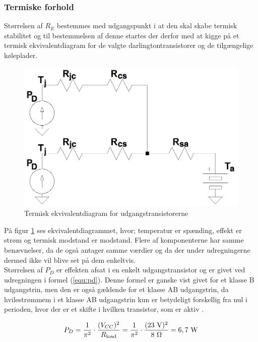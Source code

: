 \subsubsection*{Termiske forhold}
Størrelsen af $R_E$ bestemmes med udgangspunkt i at den skal skabe termisk stabilitet og til bestemmelsen af denne startes der derfor med at kigge på et termisk ekvivalentdiagram for de valgte darlingtontransistorer og de tilgængelige køleplader. 

\begin{figure}[h]
\centering
\includegraphics[scale=0.2]{teknisk/effektforstaerker/termisk_ekvivalentdiagram.png}
\caption{Termisk ekvivalentdiagram for udgangstransistorerne}
\label{fig:term-dia}
\end{figure}

På figur \ref{fig:term-dia} ses ekvivalentdiagrammet, hvor; temperatur er spænding, effekt er strøm og termisk modstand er modstand. Flere af komponenterne har samme benævnelser, da de også antager samme værdier og da der under udregningerne dermed ikke vil blive set på dem enkeltvis.\\
Størrelsen af $P_D$ er effekten afsat i en enkelt udgangstransistor og er givet ved udregningen i formel (\ref{equ:pd}). Denne formel er ganske vist givet for et klasse B udgangstrin, men den er også gældende for et klasse AB udgangstrin, da hvilestrømmem i et klasse AB udgangstrin kun er betydeligt forskellig fra nul i perioden, hvor der er et skifte i hvilken transistor, som er aktiv .

\begin{equation}
\label{equ:pd}
P_D = \frac{1}{\pi^2} \cdot \frac{(V_{CC})^2}{R_{\mathrm{load}}} = \frac{1}{\pi^2} \cdot \frac{(23~\mathrm{V})^2}{8~\ohm} = 6,7~\mathrm{W}
\end{equation}

